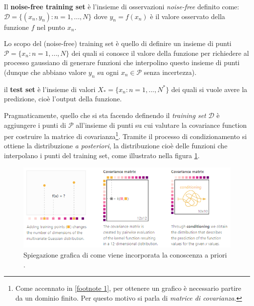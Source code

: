 \begin{defi}
Il \textbf{noise-free training set} è l'insieme di osservazioni \textit{noise-free} definito come: $\mathcal{D}=\{(x_n,y_n): n=1,...,N\}$ dove $y_n=f(x_n)$ è il valore osservato della funzione $f$ nel punto $x_n$. 
\end{defi}


Lo scopo del (noise-free) training set è quello di definire un insieme di punti $\mathcal{P}=\{x_n: n=1,...,N\}$ dei quali si conosce il valore della funzione per richiedere al processo gaussiano di generare funzioni che interpolino questo insieme di punti (dunque che abbiano valore $y_n$ su ogni $x_n\in \mathcal{P}$ senza incertezza).

\begin{defi}
il \textbf{test set} è l'insieme di valori $X_*=\{x_n:n=1,...,N^*\}$ dei quali si vuole avere la predizione, cioè l'output della funzione.
\end{defi}

Pragmaticamente, quello che si sta facendo definendo il \textit{training set} $\mathcal{D}$ è aggiungere i punti di $\mathcal{P}$ all'insieme di punti su cui valutare la covariance function per costruire la matrice di covarianza\footnote{Come accennato in \ref{footnote 1}, per ottenere un grafico è necessario partire da un dominio finito. Per questo motivo si parla di \textit{matrice di covarianza}.}. Tramite il processo di condizionamento si ottiene la distribuzione \textit{a posteriori}, la distribuzione cioè delle funzioni che interpolano i punti del training set, come illustrato nella figura \ref{intuitiveExplanationOfConditioning}.


\begin{figure}[h]
    \centering
    \includegraphics[width=1\textwidth]{images/Gaussian process/GPposterior.PNG}
    \caption{Spiegazione grafica di come viene incorporata la conoscenza a priori \cite{gortler_visual_2019}.}
    \label{intuitiveExplanationOfConditioning}
\end{figure}


